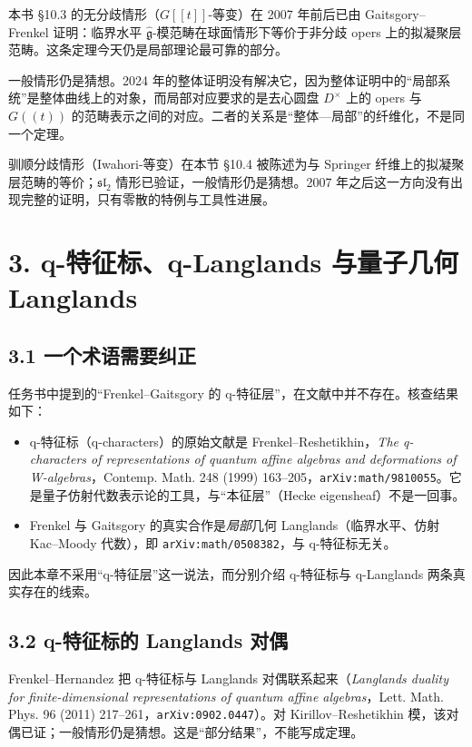 本书 §10.3 的无分歧情形（$G[[t]]$-等变）在 2007 年前后已由 Gaitsgory--Frenkel 证明：临界水平 $\hat{\mathfrak{g}}$-模范畴在球面情形下等价于非分歧 opers 上的拟凝聚层范畴。这条定理今天仍是局部理论最可靠的部分。

一般情形仍是猜想。2024 年的整体证明没有解决它，因为整体证明中的“局部系统”是整体曲线上的对象，而局部对应要求的是去心圆盘 $D^\times$ 上的 opers 与 $G((t))$ 的范畴表示之间的对应。二者的关系是“整体—局部”的纤维化，不是同一个定理。

驯顺分歧情形（Iwahori-等变）在本节 §10.4 被陈述为与 Springer 纤维上的拟凝聚层范畴的等价；$\mathfrak{sl}_2$ 情形已验证，一般情形仍是猜想。2007 年之后这一方向没有出现完整的证明，只有零散的特例与工具性进展。

\section*{3. q-特征标、q-Langlands 与量子几何 Langlands}

\subsection*{3.1 一个术语需要纠正}

任务书中提到的“Frenkel--Gaitsgory 的 q-特征层”，在文献中并不存在。核查结果如下：
\begin{itemize}
\item q-特征标（q-characters）的原始文献是 Frenkel--Reshetikhin，\emph{The q-characters of representations of quantum affine algebras and deformations of W-algebras}，Contemp. Math. 248 (1999) 163--205，\texttt{arXiv:math/9810055}。它是量子仿射代数表示论的工具，与“本征层”（Hecke eigensheaf）不是一回事。
\item Frenkel 与 Gaitsgory 的真实合作是\emph{局部}几何 Langlands（临界水平、仿射 Kac--Moody 代数），即 \texttt{arXiv:math/0508382}，与 q-特征标无关。
\end{itemize}
因此本章不采用“q-特征层”这一说法，而分别介绍 q-特征标与 q-Langlands 两条真实存在的线索。

\subsection*{3.2 q-特征标的 Langlands 对偶}

Frenkel--Hernandez 把 q-特征标与 Langlands 对偶联系起来（\emph{Langlands duality for finite-dimensional representations of quantum affine algebras}，Lett. Math. Phys. 96 (2011) 217--261，\texttt{arXiv:0902.0447}）。对 Kirillov--Reshetikhin 模，该对偶已证；一般情形仍是猜想。这是“部分结果”，不能写成定理。

